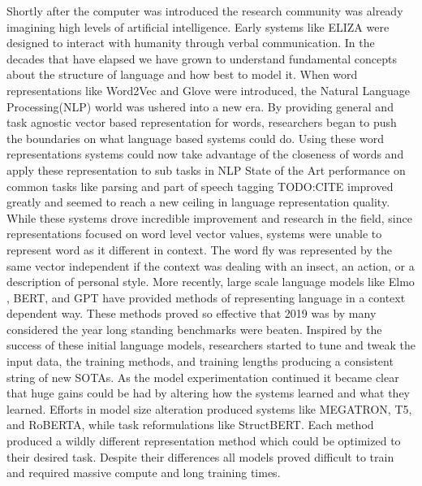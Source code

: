 \documentclass [11pt, proquest] {uwthesis}[2020/08/20]
\begin{document}
Shortly after the computer was introduced the research community was already imagining high levels of artificial intelligence. Early systems like ELIZA \cite{Weizenbaum1966ELIZAA} were designed to interact with humanity through verbal communication. In the decades that have elapsed we have grown to understand fundamental concepts about the structure of language and how best to model it. When word representations like Word2Vec \cite{Mikolov2013EfficientEO} and Glove \cite{Pennington2014GloveGV} were introduced, the Natural Language Processing(NLP) world was ushered into a new era. By providing general and task agnostic vector based representation for words, researchers began to push the boundaries on what language based systems could do. Using these word representations systems could now take advantage of the closeness of words and apply these representation to sub tasks in NLP State of the Art performance on common tasks like parsing and part of speech tagging TODO:CITE improved greatly and seemed to reach a new ceiling in language representation quality. \\ While these systems drove incredible improvement and research in the field, since representations focused on word level vector values, systems were unable to represent word as it different in context. The word fly was represented by the same vector independent if the context was dealing with an insect, an action, or a description of personal style. More recently, large scale language models like Elmo \cite{Peters2018DeepCW}, BERT, and GPT have provided methods of representing language in a context dependent way. These methods proved so effective that 2019 was by many considered the year long standing benchmarks were beaten. Inspired by the success of these initial language models, researchers started to tune and tweak the input data, the training methods, and training lengths producing a consistent string of new SOTAs. As the model experimentation continued it became clear that huge gains could be had by altering how the systems learned and what they learned. Efforts in model size alteration produced systems like MEGATRON, T5, and RoBERTA, while task reformulations like StructBERT. Each method produced a wildly different representation method which could be optimized to their desired task. Despite their differences all models proved difficult to train and required massive compute and long training times.  \\
\end{document}

